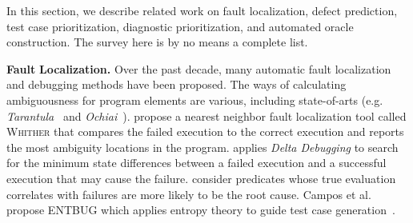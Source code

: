 In this section, we describe related work on fault localization, defect prediction, test case prioritization,  diagnostic prioritization, and automated oracle construction. The survey here is by no means a complete list.



\smallskip\noindent
\textbf{Fault} \textbf{Localization.} Over the past decade, many automatic fault localization and debugging methods have been proposed.
The ways of calculating ambiguousness  for program elements are various, including state-of-arts (e.g. {\em Tarantula}~\citep{JHS02,JH05} and {\em Ochiai}~\citep{Abreu:2009.jss}).
\cite{RR03} propose a nearest neighbor fault localization tool called \textsc{Whither} that compares the failed execution
to the correct execution and reports the most ambiguity  locations in the program.
\cite{Zeller2002a} applies {\em Delta Debugging} to search for the minimum state differences between a failed execution and a successful execution that may cause the failure. \cite{LAZJ03} consider predicates whose true evaluation correlates with failures are more likely to be the root cause. Campos et al. propose ENTBUG which applies entropy theory to guide test case generation~\cite{campos2013entropy}.



